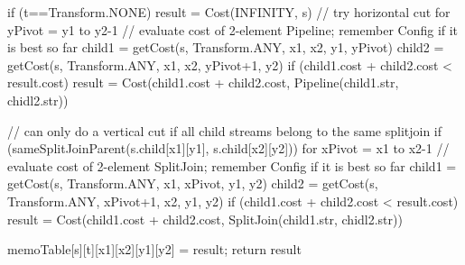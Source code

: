   if (t==Transform.NONE)
    result = Cost(INFINITY, s)
    // try horizontal cut
    for yPivot = y1 to y2-1
      // evaluate cost of 2-element Pipeline; remember Config if it is best so far
      child1 = getCost(s, Transform.ANY, x1, x2, y1, yPivot)
      child2 = getCost(s, Transform.ANY, x1, x2, yPivot+1, y2)
      if (child1.cost + child2.cost < result.cost)
        result = Cost(child1.cost + child2.cost, Pipeline(child1.str, chidl2.str))

    // can only do a vertical cut if all child streams belong to the same splitjoin
    if (sameSplitJoinParent(s.child[x1][y1], s.child[x2][y2]))
      for xPivot = x1 to x2-1
        // evaluate cost of 2-element SplitJoin; remember Config if it is best so far
        child1 = getCost(s, Transform.ANY, x1, xPivot, y1, y2)
        child2 = getCost(s, Transform.ANY, xPivot+1, x2, y1, y2)
        if (child1.cost + child2.cost < result.cost)
          result = Cost(child1.cost + child2.cost, SplitJoin(child1.str, chidl2.str))

  memoTable[s][t][x1][x2][y1][y2] = result;
  return result

